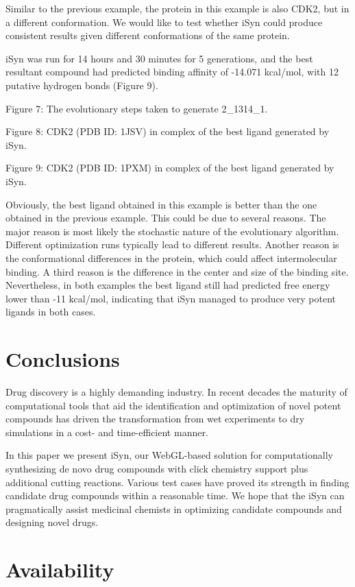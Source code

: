 Similar to the previous example, the protein in this example is also CDK2, but in a different conformation. We would like to test whether iSyn could produce consistent results given different conformations of the same protein.

iSyn was run for 14 hours and 30 minutes for 5 generations, and the best resultant compound had predicted binding affinity of -14.071 kcal/mol, with 12 putative hydrogen bonds (Figure 9).
 
Figure 7: The evolutionary steps taken to generate 2_1314_1.

Figure 8: CDK2 (PDB ID: 1JSV) in complex of the best ligand generated by iSyn.

Figure 9: CDK2 (PDB ID: 1PXM) in complex of the best ligand generated by iSyn.

Obviously, the best ligand obtained in this example is better than the one obtained in the previous example. This could be due to several reasons. The major reason is most likely the stochastic nature of the evolutionary algorithm. Different optimization runs typically lead to different results. Another reason is the conformational differences in the protein, which could affect intermolecular binding. A third reason is the difference in the center and size of the binding site. Nevertheless, in both examples the best ligand still had predicted free energy lower than -11 kcal/mol, indicating that iSyn managed to produce very potent ligands in both cases.

\section{Conclusions}

Drug discovery is a highly demanding industry. In recent decades the maturity of computational tools that aid the identification and optimization of novel potent compounds has driven the transformation from wet experiments to dry simulations in a cost- and time-efficient manner.

In this paper we present iSyn, our WebGL-based solution for computationally synthesizing de novo drug compounds with click chemistry support plus additional cutting reactions. Various test cases have proved its strength in finding candidate drug compounds within a reasonable time. We hope that the iSyn can pragmatically assist medicinal chemists in optimizing candidate compounds and designing novel drugs.

\section{Availability}

